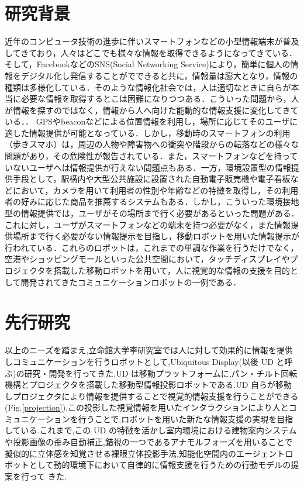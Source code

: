 \documentclass[12pt]{sonota/aislab}
\begin{document}
\section{研究背景}
近年のコンピュータ技術の進歩に伴いスマートフォンなどの小型情報端末が普及してきており，人々はどこでも様々な情報を取得できるようになってきている．そして，FacebookなどのSNS(Social Networking Service)により，簡単に個人の情報をデジタル化し発信することがでできると共に，情報量は膨大となり，情報の種類は多様化している．そのような情報化社会では，人は適切なときに自らが本当に必要な情報を取得するとこは困難になりつつある．こういった問題から，人が情報を探すのではなく，情報から人へ向けた能動的な情報支援に変化してきている．．
GPSやbeaconなどによる位置情報を利用し，場所に応じてそのユーザに適した情報提供が可能となっている．しかし，移動時のスマートフォンの利用（歩きスマホ）は，周辺の人物や障害物への衝突や階段からの転落などの様々な問題があり，その危険性が報告されている\cite{aruki}．また，スマートフォンなどを持っていないユーザへは情報提供が行えない問題点もある．一方，環境設置型の情報提供手段として，駅構内や大型公共施設に設置された自動電子販売機や電子看板などにおいて，カメラを用いて利用者の性別や年齢などの特徴を取得し，その利用者の好みに応じた商品を推薦するシステムもある．しかし，こういった環境接地型の情報提供では，ユーザがその場所まで行く必要があるといった問題がある．
\\ \indent
これに対し，ユーザがスマートフォンなどの端末を持つ必要がなく，また情報提供場所まで行く必要がない情報提示を目指し，移動ロボットを用いた情報提示が行われている\cite{spencr}\cite{UD}．これらのロボットは，これまでの単調な作業を行うだけでなく，空港やショッピングモールといった公共空間において，タッチディスプレイやプロジェクタを搭載した移動ロボットを用いて，人に視覚的な情報の支援を目的として開発されてきたコミュニケーションロボットの一例である．
\section{先行研究}
以上のニーズを踏まえ,立命館大学李研究室では人に対して効果的に情報を提供しコミュニケーションを行うロボットとして,Ubiquitous Display(以後 UD と呼ぶ)の研究・開発を行ってきた\cite{UD1}\cite{UD2}\cite{UD3}\cite{UD4}\cite{UD5}.UD は移動プラットフォームに,パン・チルト回転機構とプロジェクタを搭載した移動型情報投影ロボットである.UD 自らが移動しプロジェクタにより情報を提供することで視覚的情報支援を行うことができる(Fig.\ref{projection}).この投影した視覚情報を用いたインタラクションにより人とコミュニケーションを行うことで,ロボットを用いた新たな情報支援の実現を目指している.これまで,この UD の特徴を活かし室内環境における建物案内システムや投影画像の歪み自動補正,錯視の一つであるアナモルフォーズを用いることで擬似的に立体感を知覚させる裸眼立体投影手法\cite{UD2},知能化空間内のエージェントロボットとして動的環境下において自律的に情報支援を行うための行動モデルの提案\cite{UD5}を行って
きた.
\end{document}
